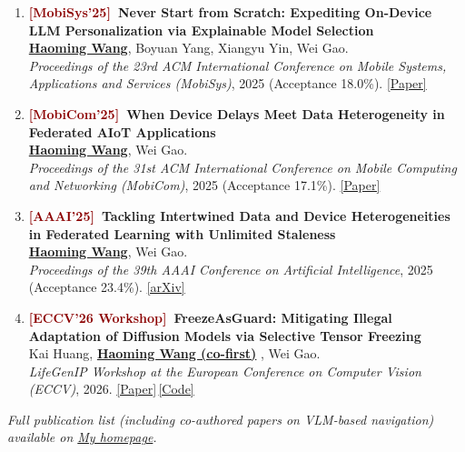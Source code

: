 \documentclass[11pt, letterpaper]{article}
\newenvironment{publist}{
  \begin{enumerate}[leftmargin=1.7em, itemsep=4pt, parsep=0pt, topsep=2pt,
                    label=\arabic*., ref=\arabic*, series=pubs]
}{\end{enumerate}}
\newcommand{\me}{\underline{\textbf{Haoming Wang}}}
\newcommand{\meco}{\underline{\textbf{Haoming Wang (co-first)}} }
\begin{document}
\begin{publist}
\item\label{pub:xpert} \textbf{\textcolor{darkred}{[MobiSys'25]}\ Never Start from Scratch: Expediting On-Device LLM Personalization via Explainable Model Selection}\\
\me, Boyuan Yang, Xiangyu Yin, Wei Gao.\\
\textit{Proceedings of the 23rd ACM International Conference on Mobile Systems, Applications and Services (MobiSys)}, 2025 (Acceptance 18.0\%). \href{https://haomingwang645.github.io/pdfs/xpert_paper.pdf}{[Paper]}

\item\label{pub:feddc} \textbf{\textcolor{darkred}{[MobiCom'25]}\ When Device Delays Meet Data Heterogeneity in Federated AIoT Applications}\\
\me, Wei Gao.\\
\textit{Proceedings of the 31st ACM International Conference on Mobile Computing and Networking (MobiCom)}, 2025 (Acceptance 17.1\%). \href{https://haomingwang645.github.io/pdfs/feddc_paper.pdf}{[Paper]}

\item\label{pub:aaai} \textbf{\textcolor{darkred}{[AAAI'25]}\ Tackling Intertwined Data and Device Heterogeneities in Federated Learning with Unlimited Staleness}\\
\me, Wei Gao.\\
\textit{Proceedings of the 39th AAAI Conference on Artificial Intelligence}, 2025 (Acceptance 23.4\%). \href{https://arxiv.org/abs/2309.13536}{[arXiv]}




\item\label{pub:freeze} \textbf{\textcolor{darkred}{[ECCV'26 Workshop]}\ FreezeAsGuard: Mitigating Illegal Adaptation of Diffusion Models via Selective Tensor Freezing}\\
Kai Huang, \meco, Wei Gao.\\
\textit{LifeGenIP Workshop at the European Conference on Computer Vision (ECCV)}, 2026. \href{https://haomingwang645.github.io/pdfs/freezeasguard_paper.pdf}{[Paper]}\,\href{https://github.com/pittisl/FreezeAsGuard}{[Code]}



\end{publist}

\vspace{2pt}
\noindent\small\textit{Full publication list (including co-authored papers on VLM-based navigation) available on \href{https://haomingwang645.github.io/}{My homepage}.}
\normalsize
\end{document}
